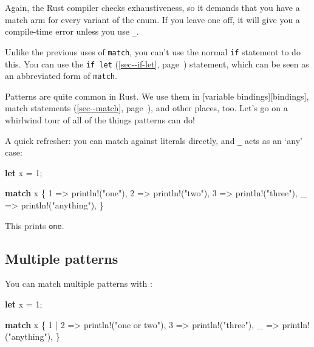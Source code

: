 \documentclass[a4paper,]{book}
\renewcommand*{\hyperref}[2][\ar]{%
  \def\ar{#2}%
  #2 (\autoref{#1}, page~\pageref{#1})}
\newenvironment{Shaded}{\begin{snugshade}}{\end{snugshade}}
\newcommand{\KeywordTok}[1]{\textcolor[rgb]{0.13,0.29,0.53}{\textbf{{#1}}}}
\newcommand{\DecValTok}[1]{\textcolor[rgb]{0.00,0.00,0.81}{{#1}}}
\newcommand{\StringTok}[1]{\textcolor[rgb]{0.31,0.60,0.02}{{#1}}}
\newcommand{\OtherTok}[1]{\textcolor[rgb]{0.56,0.35,0.01}{{#1}}}
\newcommand{\NormalTok}[1]{{#1}}
\begin{document}
Again, the Rust compiler checks exhaustiveness, so it demands that you
have a match arm for every variant of the enum. If you leave one off, it
will give you a compile-time error unless you use \texttt{\_}.

Unlike the previous uses of \texttt{match}, you can't use the normal
\texttt{if} statement to do this. You can use the
\hyperref[sec--if-let]{\texttt{if\ let}} statement, which can be seen as
an abbreviated form of \texttt{match}.


Patterns are quite common in Rust. We use them in {[}variable
bindings{]}{[}bindings{]}, \hyperref[sec--match]{match statements}, and
other places, too. Let's go on a whirlwind tour of all of the things
patterns can do!

A quick refresher: you can match against literals directly, and
\texttt{\_} acts as an `any' case:

\begin{Shaded}
\begin{Highlighting}[]
\KeywordTok{let} \NormalTok{x = }\DecValTok{1}\NormalTok{;}

\KeywordTok{match} \NormalTok{x \{}
    \DecValTok{1} \NormalTok{=> }\OtherTok{println!}\NormalTok{(}\StringTok{"one"}\NormalTok{),}
    \DecValTok{2} \NormalTok{=> }\OtherTok{println!}\NormalTok{(}\StringTok{"two"}\NormalTok{),}
    \DecValTok{3} \NormalTok{=> }\OtherTok{println!}\NormalTok{(}\StringTok{"three"}\NormalTok{),}
    \NormalTok{_ => }\OtherTok{println!}\NormalTok{(}\StringTok{"anything"}\NormalTok{),}
\NormalTok{\}}
\end{Highlighting}
\end{Shaded}

This prints \texttt{one}.

\subsection{Multiple patterns}\label{multiple-patterns}

You can match multiple patterns with \texttt{\textbar{}}:

\begin{Shaded}
\begin{Highlighting}[]
\KeywordTok{let} \NormalTok{x = }\DecValTok{1}\NormalTok{;}

\KeywordTok{match} \NormalTok{x \{}
    \DecValTok{1} \NormalTok{| }\DecValTok{2} \NormalTok{=> }\OtherTok{println!}\NormalTok{(}\StringTok{"one or two"}\NormalTok{),}
    \DecValTok{3} \NormalTok{=> }\OtherTok{println!}\NormalTok{(}\StringTok{"three"}\NormalTok{),}
    \NormalTok{_ => }\OtherTok{println!}\NormalTok{(}\StringTok{"anything"}\NormalTok{),}
\NormalTok{\}}
\end{Highlighting}
\end{Shaded}
\end{document}
